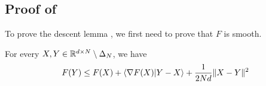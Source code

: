 \subsection{Proof of \texorpdfstring{}{}} \label{sec:proof_descent_lemma}

To prove the descent lemma , we first need to prove that $F$ is smooth.

\begin{proposition} \label{prop:l_smoothness}
    For every $X,Y \in \mathbb R^{d \times N} \setminus \Delta_N$, we have 
    \begin{equation}\label{eq:l_smoothness}
        F(Y) \leq F(X) + \langle\nabla F(X)|Y-X\rangle  + \frac{1}{2Nd} \|X-Y\|^2
    \end{equation}
\end{proposition}


